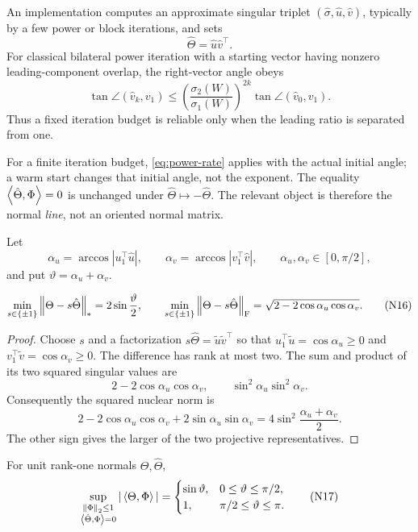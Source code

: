 An implementation computes an approximate singular triplet
\((\hat\sigma,\hat u,\hat v)\), typically by a few power or block iterations,
and sets
\[
 \hat\Theta=\hat u\hat v^\top.
\tag{N14}
\]
For classical bilateral power iteration with a starting vector having nonzero
leading-component overlap, the right-vector angle obeys
\[
 \tan\angle(\hat v_k,v_1)
 \le
 \left(\frac{\sigma_2(W)}{\sigma_1(W)}\right)^{2k}
 \tan\angle(\hat v_0,v_1).
\tag{N14a}
\label{eq:power-rate}
\]
Thus a fixed iteration budget is reliable only when the leading ratio is
separated from one.

For a finite iteration budget, \eqref{eq:power-rate} applies with the actual
initial angle; a warm start changes that initial angle, not the exponent.
The equality \(\left\langle \hat\Theta,\Phi\right\rangle=0\) is unchanged under
\(\hat\Theta\mapsto-\hat\Theta\).  The relevant object is therefore the normal
\emph{line}, not an oriented normal matrix.

Let
\[
 \alpha_u=\arccos|u_1^\top\hat u|,
 \qquad
 \alpha_v=\arccos|v_1^\top\hat v|,
 \qquad
 \alpha_u,\alpha_v\in[0,\pi/2],
\tag{N15}
\label{eq:acute-angles}
\]
and put \(\vartheta=\alpha_u+\alpha_v\).

\begin{lemma}
\label{lem:projective-normal-distance}
\[
 \min_{s\in\{\pm1\}}\left\lVert \Theta-s\hat\Theta\right\rVert_{*}
 =
 2\sin\frac{\vartheta}{2},
\qquad
 \min_{s\in\{\pm1\}}\left\lVert \Theta-s\hat\Theta\right\rVert_{\mathrm F}
 =
 \sqrt{2-2\cos\alpha_u\cos\alpha_v}.
\tag{N16}
\label{eq:projective-distance}
\]
\end{lemma}

\begin{proof}
Choose \(s\) and a factorization
\(s\hat\Theta=\tilde u\tilde v^\top\) so that
\(u_1^\top\tilde u=\cos\alpha_u\ge0\) and
\(v_1^\top\tilde v=\cos\alpha_v\ge0\).  The difference has rank at most two.
The sum and product of its two squared singular values are
\[
 2-2\cos\alpha_u\cos\alpha_v,
 \qquad
 \sin^2\alpha_u\sin^2\alpha_v.
\]
Consequently the squared nuclear norm is
\[
 2-2\cos\alpha_u\cos\alpha_v
 +2\sin\alpha_u\sin\alpha_v
 =4\sin^2\frac{\alpha_u+\alpha_v}{2}.
\]
The other sign gives the larger of the two projective representatives.
\end{proof}

\begin{theorem}
\label{thm:sharp-normal-leakage}
For unit rank-one normals \(\Theta,\hat\Theta\),
\[
 \sup_{\substack{\left\lVert \Phi\right\rVert_{2}\le1\\
                  \left\langle \hat\Theta,\Phi\right\rangle=0}}
 |\left\langle \Theta,\Phi\right\rangle|
 =
 \begin{cases}
 \sin\vartheta,&0\le\vartheta\le\pi/2,\\
 1,&\pi/2\le\vartheta\le\pi.
 \end{cases}
\tag{N17}
\label{eq:sharp-normal-leakage}
\]
\end{theorem}


